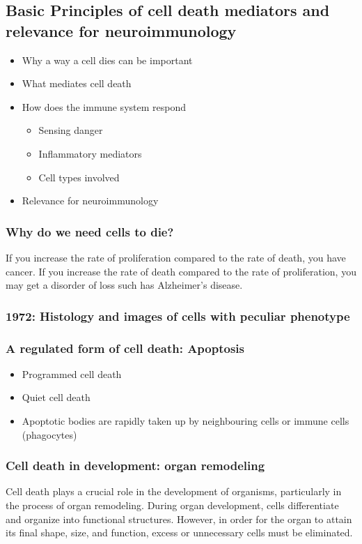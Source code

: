 \begin{itemize}
\begin{itemize}
\section{Basic Principles of cell death mediators and relevance for neuroimmunology}
\begin{itemize}
    \item Why a way a cell dies can be important
    \item What mediates cell death
    \item How does the immune system respond
    \begin{itemize}
        \item Sensing danger
        \item Inflammatory mediators
        \item Cell types involved
    \end{itemize}
    \item Relevance for neuroimmunology
\end{itemize}
\subsubsection{Why do we need cells to die?}
If you increase the rate of proliferation compared to the rate of death, you have cancer. If you increase the rate of death compared to the rate of proliferation, you may get a disorder of loss such has Alzheimer's disease. 
\subsubsection{1972: Histology and images of cells with peculiar phenotype}

\subsubsection{A regulated form of cell death: Apoptosis}
\begin{itemize}
    \item Programmed cell death
    \item Quiet cell death
    \item Apoptotic bodies are rapidly taken up by neighbouring cells or immune cells (phagocytes)
    
\end{itemize}

\subsubsection{Cell death in development: organ remodeling}
Cell death plays a crucial role in the development of organisms, particularly in the process of organ remodeling. During organ development, cells differentiate and organize into functional structures. However, in order for the organ to attain its final shape, size, and function, excess or unnecessary cells must be eliminated.


\end{itemize}
\end{itemize}
